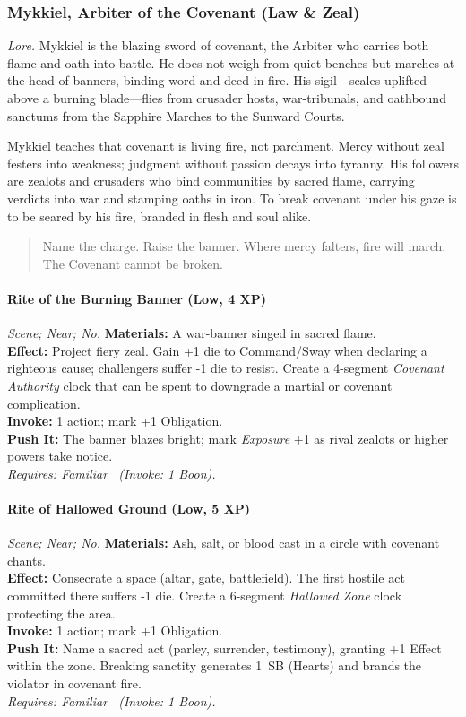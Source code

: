 
\subsubsection{Mykkiel, Arbiter of the Covenant (Law \& Zeal)}
\textit{Lore.} Mykkiel is the blazing sword of covenant, the Arbiter who carries both flame and oath into battle. He does not weigh from quiet benches but marches at the head of banners, binding word and deed in fire. His sigil—scales uplifted above a burning blade—flies from crusader hosts, war-tribunals, and oathbound sanctums from the Sapphire Marches to the Sunward Courts.

Mykkiel teaches that covenant is living fire, not parchment. Mercy without zeal festers into weakness; judgment without passion decays into tyranny. His followers are zealots and crusaders who bind communities by sacred flame, carrying verdicts into war and stamping oaths in iron. To break covenant under his gaze is to be seared by his fire, branded in flesh and soul alike.

\begin{quote}
Name the charge. Raise the banner. Where mercy falters, fire will march. The Covenant cannot be broken.
\end{quote}

\paragraph*{Rite of the Burning Banner (Low, 4 XP)} \emph{Scene; Near; No.}
\textbf{Materials:} A war-banner singed in sacred flame.\\
\textbf{Effect:} Project fiery zeal. Gain +1 die to Command/Sway when declaring a righteous cause; challengers suffer -1 die to resist. Create a 4-segment \emph{Covenant Authority} clock that can be spent to downgrade a martial or covenant complication.\\
\textbf{Invoke:} 1 action; mark +1 Obligation.\\
\textbf{Push It:} The banner blazes bright; mark \emph{Exposure} +1 as rival zealots or higher powers take notice.\\
\emph{Requires: Familiar \ (\textit{Invoke:} 1 Boon).}

\paragraph*{Rite of Hallowed Ground (Low, 5 XP)} \emph{Scene; Near; No.}
\textbf{Materials:} Ash, salt, or blood cast in a circle with covenant chants.\\
\textbf{Effect:} Consecrate a space (altar, gate, battlefield). The first hostile act committed there suffers -1 die. Create a 6-segment \emph{Hallowed Zone} clock protecting the area.\\
\textbf{Invoke:} 1 action; mark +1 Obligation.\\
\textbf{Push It:} Name a sacred act (parley, surrender, testimony), granting +1 Effect within the zone. Breaking sanctity generates 1~SB (Hearts) and brands the violator in covenant fire.\\
\emph{Requires: Familiar \ (\textit{Invoke:} 1 Boon).}

